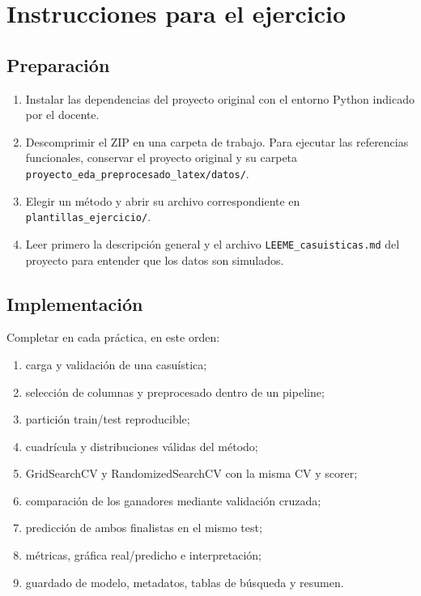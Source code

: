 \documentclass[11pt,a4paper]{article}
\begin{document}
\section{Instrucciones para el ejercicio}
\subsection{Preparación}
\begin{enumerate}
\item Instalar las dependencias del proyecto original con el entorno Python indicado por el docente.
\item Descomprimir el ZIP en una carpeta de trabajo. Para ejecutar las referencias funcionales, conservar el proyecto original y su carpeta \texttt{proyecto\_eda\_preprocesado\_latex/datos/}.
\item Elegir un método y abrir su archivo correspondiente en \texttt{plantillas\_ejercicio/}.
\item Leer primero la descripción general y el archivo \texttt{LEEME\_casuisticas.md} del proyecto para entender que los datos son simulados.
\end{enumerate}

\subsection{Implementación}
Completar en cada práctica, en este orden:
\begin{enumerate}
\item carga y validación de una casuística;
\item selección de columnas y preprocesado dentro de un pipeline;
\item partición train/test reproducible;
\item cuadrícula y distribuciones válidas del método;
\item GridSearchCV y RandomizedSearchCV con la misma CV y scorer;
\item comparación de los ganadores mediante validación cruzada;
\item predicción de ambos finalistas en el mismo test;
\item métricas, gráfica real/predicho e interpretación;
\item guardado de modelo, metadatos, tablas de búsqueda y resumen.
\end{enumerate}
\end{document}
